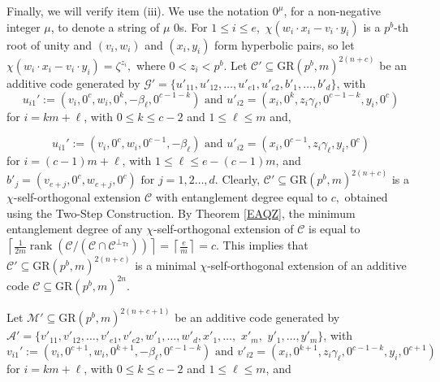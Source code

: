 \documentclass{article}
\DeclareMathOperator{\Tr}{Tr}
\DeclareMathOperator{\rank}{rank}
\theoremstyle{remark}
\theoremstyle{definition}
\numberwithin{equation}{section}
\begin{document}
Finally, we will verify item (iii). We use the notation $0^{\mu}$, for a non-negative integer $\mu$, to denote a string of $\mu$ $0$s. For $1 \leq i \leq e,$ $\chi(w_i \cdot x_i-v_i \cdot y_i)$ is a $p^b$-th root of unity and $(v_i,w_i)$ and $(x_i,y_i)$ form hyperbolic pairs, so let $\chi(w_i \cdot x_i-v_i \cdot y_i)=\zeta^{z_{i}},$ where  $0< z_{i} < p^b.$  Let $\mathcal{C}'\subseteq \text{GR}(p^b,m)^{2(n+c)}$ be an additive code generated by $\mathcal{G}' = \{u'_{11},u'_{12},\ldots,u'_{e1},u'_{e2},b'_1,\ldots,b'_d\}$, with 
$$
 u_{i1}' := (v_i,0^c,w_i,0^k,-\beta_{\ell},0^{c-1-k}) \text{ and }  u'_{i2} = (x_i,0^{k},z_i\gamma_{\ell},0^{c-1-k},y_i,0^c)
 $$ for $i = km+ \ell$, with $0 \le k \le c-2$ and $1 \le \ell \le m$  and, 

  $$
 u_{i1}' := (v_i,0^c,w_i,0^{c-1},-\beta_{\ell}) \text{ and }  u'_{i2} = (x_i,0^{c-1},z_i\gamma_{\ell},y_i,0^c)
 $$ for $i = (c-1)m + \ell$, with $1 \le \ell \le e-(c-1)m$, and  $b'_j = (v_{e+j},0^c,w_{e+j},0^c) \text{ for } j=1,2\ldots,d$. Clearly, $\mathcal{C}'\subseteq \text{GR}(p^b,m)^{2(n+c)}$ is a $\chi$-self-orthogonal extension $\mathcal{C}$ with entanglement degree equal to $c,$   obtained using the Two-Step Construction.  
By Theorem \ref{EAQZ}, the minimum entanglement degree of any $\chi$-self-orthogonal extension of $\mathcal{C}$ is equal to  $\left\lceil { \frac{1}{2m} \rank(\mathcal{C}/(\mathcal{C} \cap \mathcal{C}^{\perp_{\Tr}}))  }\right\rceil=\left\lceil  \frac{e}{m}\right\rceil=c.$ This implies that $\mathcal{C}'\subseteq \text{GR}(p^b,m)^{2(n+c)}$ is a minimal $\chi$-self-orthogonal extension of an additive code $\mathcal{C} \subseteq \text{GR}(p^b,m)^{2n}.$ 

Let $\mathcal{M}'\subseteq \text{GR}(p^b,m)^{2(n+c+1)}$ be an additive code generated by $\mathcal{A}' = \{v'_{11},v'_{12},\ldots,v'_{e1},v'_{e2},w'_1,\ldots,w'_d,x'_1,\ldots,$ $x'_m,$ $y'_1,\ldots,y'_m\}$, with 
$$
 v_{i1}' := (v_i,0^{c+1},w_i,0^{k+1},-\beta_{\ell},0^{c-1-k}) \text{ and }  v'_{i2} = (x_i,0^{k+1},z_{i}\gamma_{\ell},0^{c-1-k},y_i,0^{c+1})
 $$ for $i = km+ \ell$, with $0 \le k \le c-2$ and $1 \le \ell \le m$, and
\end{document}
